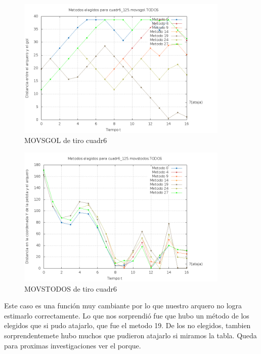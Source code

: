\begin{figure}[H]
\begin{center}
\includegraphics[width=0.9\textwidth]{img/cuadr6_125_movsgol_TODOS_elegidos.png}
     \caption{MOVSGOL de tiro cuadr6}
\end{center}
\end{figure}

\begin{figure}[H]
\begin{center}
\includegraphics[width=0.9\textwidth]{img/cuadr6_125_movstodos_TODOS_elegidos.png}
     \caption{MOVSTODOS de tiro cuadr6}
\end{center}     
\end{figure}

Este caso es una función muy cambiante por lo que nuestro arquero no logra estimarlo correctamente.
Lo que nos sorprendió fue que hubo un método de los elegidos que si pudo atajarlo, que fue el metodo
19. De los no elegidos, tambien sorprendentemete hubo muchos que pudieron atajarlo si miramos la
tabla. Queda para proximas investigaciones ver el porque.



